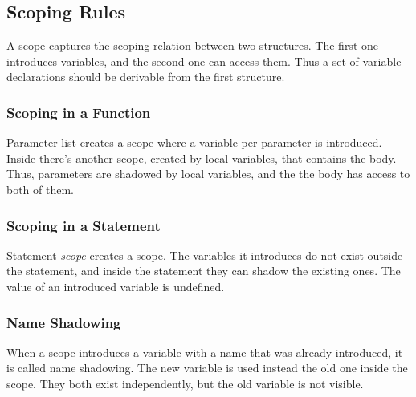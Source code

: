 \documentclass [a4paper] {article}
\begin{document}
\subsection { Scoping Rules }

A scope captures the scoping relation between two structures. The first one
introduces variables, and the second one can access them. Thus a set of variable
declarations should be derivable from the first structure.

\subsubsection { Scoping in a Function }

Parameter list creates a scope where a variable per parameter is introduced.
Inside there's another scope, created by local variables, that contains the
body. Thus, parameters are shadowed by local variables, and the the body has
access to both of them.

\subsubsection { Scoping in a Statement }

Statement \emph{scope} creates a scope. The variables it introduces do not exist
outside the statement, and inside the statement they can shadow the existing
ones. The value of an introduced variable is undefined.

\subsubsection { Name Shadowing }

When a scope introduces a variable with a name that was already introduced, it
is called name shadowing. The new variable is used instead the old one inside
the scope. They both exist independently, but the old variable is not visible.
\end{document}
